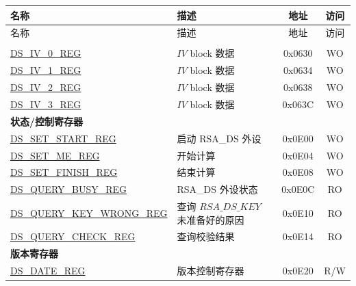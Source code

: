 


\begin{longtable}{ | p{5.2cm} | p{6.6cm} | c| c| }
\hline\rowcolor{lightgray}
名称 & 描述 &  地址 & 访问 \\ \hline
\endfirsthead
        \hline
        \rowcolor{lightgray}
名称 & 描述 &  地址 & 访问 \\ \hline

        \endhead
        \endfoot
\multicolumn{4}{|l|}{\textbf{配置寄存器}} \\ \hline
\hyperref[regdesc:DSIVREG]{DS\_IV\_0\_REG}               & \begin{math}IV\end{math} block 数据         & 0x0630 & WO \\ \hline
\hyperref[regdesc:DSIVREG]{DS\_IV\_1\_REG}               & \begin{math}IV\end{math} block 数据          & 0x0634 & WO \\ \hline
\hyperref[regdesc:DSIVREG]{DS\_IV\_2\_REG}               & \begin{math}IV\end{math} block 数据          & 0x0638 & WO \\ \hline
\hyperref[regdesc:DSIVREG]{DS\_IV\_3\_REG}               & \begin{math}IV\end{math} block 数据           & 0x063C & WO \\ \hline
\multicolumn{4}{|l|}{\textbf{状态/控制寄存器}} \\ \hline
\hyperref[regdesc:DSSETSTARTREG]{DS\_SET\_START\_REG}               & 启动 RSA\_DS 外设     & 0x0E00 & WO \\ \hline
\hyperref[regdesc:DSSETMEREG]{DS\_SET\_ME\_REG}                     & 开始计算       & 0x0E04 & WO \\ \hline
\hyperref[regdesc:DSSETFINISHREG]{DS\_SET\_FINISH\_REG}             & 结束计算         & 0x0E08 & WO \\ \hline
\hyperref[regdesc:DSQUERYBUSYREG]{DS\_QUERY\_BUSY\_REG}             & RSA\_DS 外设状态& 0x0E0C & RO \\ \hline
\hyperref[regdesc:DSQUERYKEYWRONGREG]{DS\_QUERY\_KEY\_WRONG\_REG}   & 查询 \begin{math}RSA\_DS\_KEY\end{math} 未准备好的原因       & 0x0E10 & RO \\ \hline
\hyperref[regdesc:DSQUERYCHECKREG]{DS\_QUERY\_CHECK\_REG}           & 查询校验结果    & 0x0E14 & RO \\ \hline
\multicolumn{4}{|l|}{\textbf{版本寄存器}} \\ \hline
\hyperref[regdesc:DSDATEREG]{DS\_DATE\_REG}                   & 版本控制寄存器   & 0x0E20 & R/W \\ \hline
\end{longtable}
